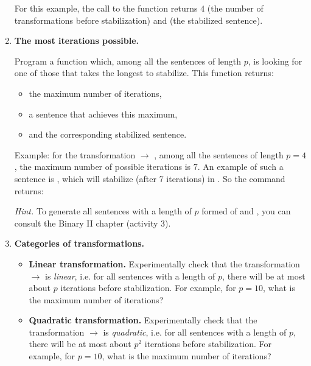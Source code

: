 \documentclass[11pt,class=report,crop=false]{standalone}
\begin{document}
\begin{activite}
\begin{enumerate}
For this example, the call to the  function returns $4$ (the number of transformations before stabilization) and  (the stabilized sentence).

	\item \textbf{The most iterations possible.}
	
	Program a  function
which, among all the sentences of length $p$, is looking for one of those that takes the longest to stabilize. This function returns:
\begin{itemize}
  \item the maximum number of iterations,
  \item a sentence that achieves this maximum,
  \item and the corresponding stabilized sentence.
\end{itemize}

Example: for the transformation \rzero\run{} $\rightarrow$ \run\rzero\rzero, among all the sentences of length $p=4$, the maximum number of possible iterations is $7$. An example of such a sentence is \rzero\run\run\run, which will stabilize (after 7 iterations) in \run\run\run\rzero\rzero\rzero\rzero\rzero\rzero\rzero\rzero.
So the  command returns: 


  \emph{Hint.} To generate all sentences with a length of $p$ formed of \rzero{} and \run{}, you can consult the \og{}Binary II\fg{} chapter (activity 3).

	\item \textbf{Categories of transformations.}
	
	\begin{itemize} 
	\item \textbf{Linear transformation.}
	Experimentally check that the transformation \rzero\rzero\run\run{} $\rightarrow$\run\run\rzero{} is \emph{linear}, i.e. for all sentences with a length of $p$, there will be at most about $p$ iterations before stabilization. For example, for $p=10$, what is the maximum number of iterations?
	
	\item \textbf{Quadratic transformation.}
	Experimentally check that the transformation \rzero\run{} $\rightarrow$\run\rzero{} is \emph{quadratic}, i.e. for all sentences with a length of $p$, there will be at most about $p^2$ iterations before stabilization. For example, for $p=10$, what is the maximum number of iterations?
	

\end{itemize}
\end{enumerate}
\end{activite}
\end{document}
